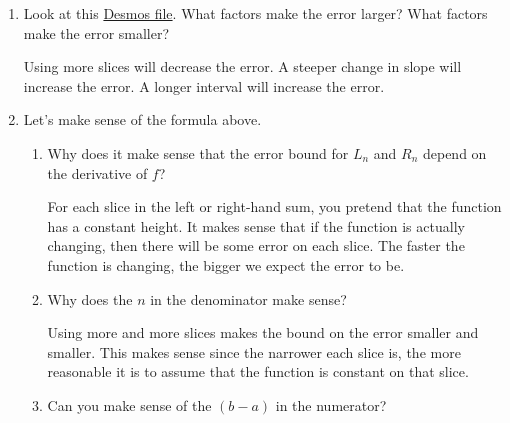 \documentclass[main]{subfiles}
\begin{document}
\begin{enumerate}

\item\begin{problem}[\vfill]
    Look at this \href{https://www.desmos.com/calculator/0avvclvfj7}{Desmos file}. What factors make the error larger? What factors make the error smaller?
\end{problem} 

\begin{solution}
    Using more slices will decrease the error. A steeper change in slope will increase the error. A longer interval will increase the error.
\end{solution}
\item 
  \begin{problem}
Let's make sense of the formula above.
  \end{problem}
  \begin{enumerate}
   
   \item
   \begin{problem}[\vfill]
   Why does it make sense that the error bound for $L_{n}$ and $R_{n}$ depend on the derivative of $f$?
   \end{problem}

   \begin{solution}
   For each slice in the left or right-hand sum, you pretend that the function has a constant height.  It makes sense that if the function is actually changing, then there will be some error on each slice.  The faster the function is changing, the bigger we expect the error to be.
   \end{solution}

   \item
   \begin{problem}[\vfill]
   Why does the $n$ in the denominator make sense?
   \end{problem}

   \begin{solution}
   Using more and more slices makes the bound on the error smaller and smaller.  This makes sense since the narrower each slice is, the more reasonable it is to assume that the function is constant on that slice.
   \end{solution}
   
   \item
   \begin{problem}[\vfill]
   Can you make sense of the $(b-a)$ in the numerator?
   \end{problem}


\end{enumerate}
\end{enumerate}
\end{document}
